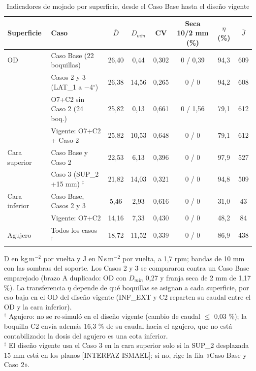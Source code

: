 
\begin{table}[htbp]
\centering\small\singlespacing
\setlength{\tabcolsep}{3.5pt}
\caption{Indicadores de mojado por superficie, desde el Caso Base hasta el diseño vigente}
\label{tab:cfd-evolucion}
\begin{tabular}{@{}llcccccc@{}}
\toprule
\textbf{Superficie} & \textbf{Caso} & \textbf{$\bar D$} & \textbf{$D_{mín}$} & \textbf{CV} & \textbf{Seca 10/2 mm (\%)} & \textbf{$\eta$ (\%)} & \textbf{$\bar J$}\\
\midrule
OD & Caso Base (22 boquillas) & 26,40 & 0,44 & 0,302 & 0 / 0,39 & 94,3 & 609\\
 & Casos 2 y 3 (LAT\_1 a $-$4$^\circ$) & 26,38 & 14,56 & 0,265 & 0 / 0 & 94,2 & 608\\
 & O7+C2 sin Caso 2 (24 boq.) & 25,82 & 0,13 & 0,661 & 0 / 1,56 & 79,1 & 612\\
 & Vigente: O7+C2 + Caso 2 & 25,82 & 10,53 & 0,648 & 0 / 0 & 79,1 & 612\\
\addlinespace
Cara superior & Caso Base y Caso 2 & 22,53 & 6,13 & 0,396 & 0 / 0 & 97,9 & 527\\
 & Caso 3 (SUP\_2 +15 mm) $^\ddagger$ & 21,82 & 14,03 & 0,321 & 0 / 0 & 94,8 & 509\\
\addlinespace
Cara inferior & Caso Base, Casos 2 y 3 & 5,46 & 2,93 & 0,616 & 0 / 0 & 31,0 & 43\\
 & Vigente: O7+C2 & 14,16 & 7,33 & 0,430 & 0 / 0 & 48,2 & 84\\
\addlinespace
Agujero & Todos los casos $^\dagger$ & 18,72 & 11,52 & 0,339 & 0 / 0 & 86,9 & 438\\
\bottomrule
\end{tabular}
\par\smallskip\footnotesize
D en kg\,m$^{-2}$ por vuelta y J en N\,s\,m$^{-2}$ por vuelta, a 1,7 rpm; bandas de 10 mm con las sombras del soporte. Los Casos 2 y 3 se compararon contra un Caso Base emparejado (brazo A duplicado: OD con $D_{mín}$ 0,27 y franja seca de 2 mm de 1,17 \%). La transferencia $\eta$ depende de qué boquillas se asignan a cada superficie, por eso baja en el OD del diseño vigente (INF\_EXT y C2 reparten su caudal entre el OD y la cara inferior).\\
$^\dagger$ Agujero: no se re-simuló en el diseño vigente (cambio de caudal $\leq$ 0,03 \%); la boquilla C2 envía además 16,3 \% de su caudal hacia el agujero, que no está contabilizado: la dosis del agujero es una cota inferior.\\
$^\ddagger$ El diseño vigente usa el Caso 3 en la cara superior solo si la SUP\_2 desplazada 15 mm está en los planos [INTERFAZ ISMAEL]; si no, rige la fila «Caso Base y Caso 2».
\end{table}

